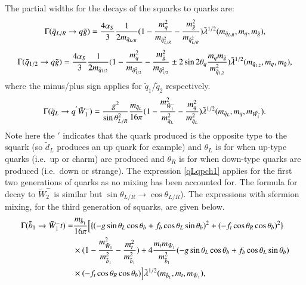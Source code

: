 \documentclass[final,3p,times,pdflatex]{elsarticle}
\begin{document}
The partial widths for the decays of the squarks to quarks are:
\begin{equation}\label{qLRqglu}
\Gamma(\tilde{q}_{L/R} \rightarrow q \tilde{g} ) = {4\alpha_{S} \over 3} {1 \over 2m_{\tilde{q}_{L/R}} } (1 - {m_{q}^2 \over m_{\tilde{q}_{L/R}^2}} - {m_{\tilde{g}}^2 \over m_{\tilde{q}_{L/R}^2}}) \tilde{\lambda}^{1/2} (m_{\tilde{q}_{L,R}}, m_q, m_{\tilde{g}}),
\end{equation} 
\begin{equation}\label{q12qglu}
\Gamma(\tilde{q}_{1/2} \rightarrow q \tilde{g} ) = {4\alpha_{S} \over 3} {1 \over 2m_{\tilde{q}_{1/2}} } (1 - {m_{q}^2 \over m_{\tilde{q}_{1/2}^2}} - {m_{\tilde{g}}^2 \over m_{\tilde{q}_{1/2}^2}} \pm 2\sin2\theta_q{m_qm_{\tilde{g}} \over m_{\tilde{q}_{1,2}}^2}) \tilde{\lambda}^{1/2} (m_{\tilde{q}_{1,2}}, m_q, m_{\tilde{g}}),
\end{equation} 
where the minus/plus sign applies for $\tilde{q}_1$/$\tilde{q}_2$ respectively.
\begin{equation}\label{qLqpch1}
\Gamma(\tilde{q}_{L} \rightarrow q^{'} \tilde{W}_{1}^- ) = {g^2 \over \sin\theta_{L/R}^2 } {m_{\tilde{q}_{L}} \over 16\pi} ( 1 - {m_{\tilde{W}_{1}^{-}}^2 \over m_{\tilde{q}_{L}}^2} - {m_{q}^2 \over m_{\tilde{q}_{L}}^2 }) \tilde{\lambda}^{1/2} (m_{\tilde{q}_{L}}, m_q, m_{\tilde{W_{1}^-}}).
\end{equation} 
Note here the $'$ indicates that the quark produced is the opposite type to the squark (so $\tilde{d}_L$
produces an up quark for example) and $\theta_L$ is for when up-type quarks (i.e.\ up or charm) are produced
and $\theta_R$ is for when down-type quarks are produced (i.e.\ down or strange). The expression \eqref{qLqpch1} applies for the first two generations of quarks as no mixing has been accounted for. The formula for decay to $\tilde{W}_{2}^{-}$ is similar but $\sin \theta_{L/R} \rightarrow \cos \theta_{L/R}$). The expressions with sfermion mixing, for the third generation of squarks, are given below.
\begin{equation}\label{b1tch1}
\begin{aligned}
\Gamma(\tilde{b}_{1} \rightarrow \tilde{W}_{1}^- t ) = & {m_{\tilde{b}_1} \over 16\pi} \Big[\{ ({-g\sin\theta_L\cos\theta_b + f_b\cos\theta_L\sin\theta_b})^2 + ({-f_t\cos\theta_R\cos\theta_b})^2 \} \\ & \times (1 - {m_{\tilde{W}_{1}}^2 \over m_{\tilde{b}_{1}}^2 } - {m_{t}^2 \over m_{\tilde{b}_{1}}^2 } ) + 4 {m_t m_{\tilde{W}_1} \over m_{\tilde{b}_1}^2 }({-g\sin\theta_L\cos\theta_b + f_b\cos\theta_L\sin\theta_b})\\ &  \times (-f_{t}\cos\theta_R\cos\theta_b)\Big]  \tilde{\lambda}^{1/2}(m_{\tilde{b}_1},m_t,m_{\tilde{W}_1}) ,
\end{aligned}
\end{equation} 
\end{document}
